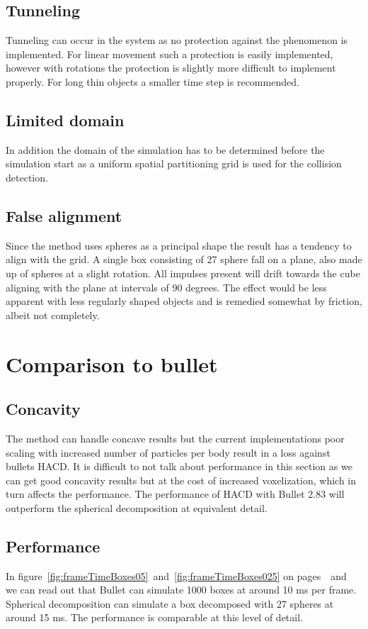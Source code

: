 \subsection{Tunneling}
Tunneling can occur in the system as no protection against the phenomenon is implemented.
For linear movement such a protection is easily implemented, however with rotations
the protection is slightly more difficult to implement properly. For long thin
objects a smaller time step is recommended.
\subsection{Limited domain}
In addition the domain of the simulation has to be determined before the simulation start
as a uniform spatial partitioning grid is used for the collision detection.

\subsection{False alignment}
Since the method uses spheres as a principal shape the result has a tendency to align
with the grid. A single box consisting of 27 sphere fall on a plane, also made up of spheres
at a slight rotation. All impulses present will drift towards the cube aligning with the
plane at intervals of 90 degrees. The effect would be less apparent with less regularly shaped objects and
is remedied somewhat by friction, albeit not completely.

\section{Comparison to bullet}
\subsection{Concavity}
The method can handle concave results but the current implementations poor scaling
with increased number of particles per body result in a loss against bullets HACD.
It is difficult to not talk about performance in this section as we can get good
concavity results but at the cost of increased voxelization, which in turn affects the
performance.
The performance of HACD with Bullet 2.83 will outperform the spherical decomposition
at equivalent detail.
\subsection{Performance}
In figure~\ref{fig:frameTimeBoxes05}~and~\ref{fig:frameTimeBoxes025}
on pages~\pageref{fig:frameTimeBoxes05}~and~\pageref{fig:frameTimeBoxes025}
we can read out that Bullet can simulate 1000 boxes at around 10 ms per frame.
Spherical decomposition can simulate a box decomposed with 27 spheres at around 15 ms.
The performance is comparable at this level of detail.


